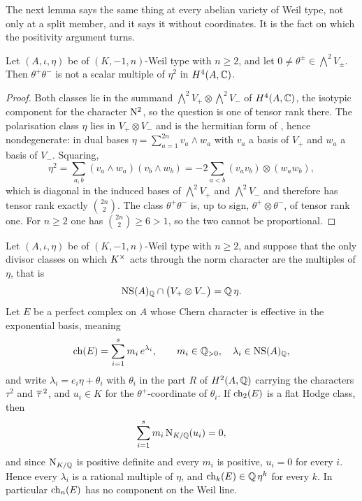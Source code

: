 The next lemma says the same thing at every abelian variety of Weil type, not
only at a split member, and it says it without coordinates. It is the fact on
which the positivity argument turns.

\begin{lemma}
\label{lem:tensorrank}
Let $(A,\iota,\eta)$ be of $(K,-1,n)$-Weil type with $n\ge2$, and let
$0\ne\theta^{\pm}\in\bigwedge^{2}V_{\pm}$. Then $\theta^{+}\theta^{-}$ is not a
scalar multiple of $\eta^{2}$ in $H^{4}(A,\mathbb{C})$.
\end{lemma}

\begin{proof}
Both classes lie in the summand
$\bigwedge^{2}V_{+}\otimes\bigwedge^{2}V_{-}$ of $H^{4}(A,\mathbb{C})$, the isotypic
component for the character $\mathrm{N}^{2}$, so the question is one of tensor rank
there. The polarisation class $\eta$ lies in $V_{+}\otimes V_{-}$ and is the
hermitian form of \cite[Proposition~3.7]{paperI}, hence nondegenerate: in dual bases
$\eta=\sum_{a=1}^{2n}v_{a}\wedge w_{a}$ with $v_{a}$ a basis of $V_{+}$ and
$w_{a}$ a basis of $V_{-}$. Squaring,
\[
  \eta^{2}
  =\sum_{a,b}(v_{a}\wedge w_{a})(v_{b}\wedge w_{b})
  =-2\sum_{a<b}(v_{a}v_{b})\otimes(w_{a}w_{b}),
\]
which is diagonal in the induced bases of $\bigwedge^{2}V_{+}$ and
$\bigwedge^{2}V_{-}$ and therefore has tensor rank exactly $\binom{2n}{2}$.
The class $\theta^{+}\theta^{-}$ is, up to sign,
$\theta^{+}\otimes\theta^{-}$, of tensor rank one. For $n\ge2$ one has
$\binom{2n}{2}\ge6>1$, so the two cannot be proportional.
\end{proof}

\begin{theorem}\label{thm:positivity}
Let $(A,\iota,\eta)$ be of $(K,-1,n)$-Weil type with $n\ge2$, and suppose that
the only divisor classes on which $K^{\times}$ acts through the norm character are
the multiples of $\eta$, that is
\begin{equation}\label{eq:noextranorm}
  \mathrm{NS}(A)_{\mathbb{Q}}\cap\bigl(V_{+}\otimes V_{-}\bigr)=\mathbb{Q}\,\eta .
\end{equation}
Let $E$ be a perfect complex on $A$ whose Chern character is effective in the
exponential basis, meaning
\begin{equation}\label{eq:effectivech}
  \operatorname{ch}(E)=\sum_{i=1}^{s}m_{i}\,e^{\lambda_{i}},
  \qquad m_{i}\in\mathbb{Q}_{>0},\quad\lambda_{i}\in\mathrm{NS}(A)_{\mathbb{Q}},
\end{equation}
and write $\lambda_{i}=e_{i}\eta+\theta_{i}$ with $\theta_{i}$ in the part $R$
of $H^{2}(A,\mathbb{Q})$ carrying the characters $\tau^{2}$ and $\overline{\tau}^{\,2}$, and
$u_{i}\in K$ for the $\theta^{+}$-coordinate of $\theta_{i}$. If $\operatorname{ch}_{2}(E)$
is a flat Hodge class, then
\begin{equation}\label{eq:normsum}
  \sum_{i=1}^{s}m_{i}\,\mathrm{N}_{K/\mathbb{Q}}(u_{i})=0 ,
\end{equation}
and since $\mathrm{N}_{K/\mathbb{Q}}$ is positive definite and every $m_{i}$ is positive,
$u_{i}=0$ for every $i$. Hence every $\lambda_{i}$ is a rational multiple of
$\eta$, and $\operatorname{ch}_{k}(E)\in\mathbb{Q}\,\eta^{k}$ for every $k$. In particular
$\operatorname{ch}_{n}(E)$ has no component on the Weil line.
\end{theorem}

